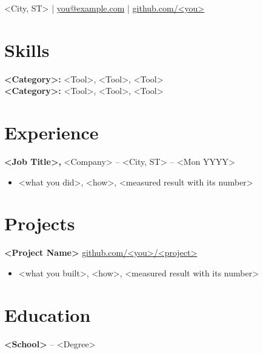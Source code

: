 \documentclass[11pt]{article}       %
\begin{document}
\centerline{}

\vspace{5pt}

\centerline{<City, ST> | \href{mailto:you@example.com}{you@example.com} | \href{https://github.com/<you>}{github.com/<you>}}

\vspace{-10pt}

\section*{Skills}
\textbf{<Category>:} <Tool>, <Tool>, <Tool> \\
\textbf{<Category>:} <Tool>, <Tool>, <Tool>

\vspace{-6.5pt}

\section*{Experience}
\textbf{<Job Title>,} <Company> -- <City, ST>  -- <Mon YYYY> \\
\vspace{-9pt}
\begin{itemize}
  \item <Past-tense verb> <what you did>, <how>, <measured result with its number>
\end{itemize}

\vspace{-18.5pt}

\section*{Projects}
\textbf{<Project Name>} \hfill \href{https://github.com/<you>/<project>}{github.com/<you>/<project>} \\
\vspace{-9pt}
\begin{itemize}
  \item <Past-tense verb> <what you built>, <how>, <measured result with its number>
\end{itemize}

\vspace{-18.5pt}

\section*{Education}
\textbf{<School>} -- <Degree> 
\end{document}
